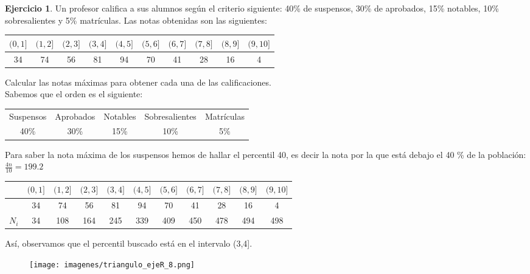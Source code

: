 \documentclass[a4paper, 12pt]{article}
\theoremstyle{definition}
\newtheorem{ej}{Ejercicio}
\begin{document}
\begin{ej}
Un profesor califica a sus alumnos según el criterio siguiente: 40\% de suspensos, 30\% de aprobados, 15\% notables, 10\% sobresalientes y 5\% matrículas. Las notas obtenidas son las siguientes:

\begin{center}
\begin{tabular}{|c|c|c|c|c|c|c|c|c|c|}
\hline
     \((0,1]\) & \((1,2]\) & \((2,3]\) & \((3,4]\) & \((4,5]\) & \((5,6]\) & \((6,7]\) & \((7,8]\) & \((8,9]\) & \((9,10]\) \\
     \hline
     34 & 74 & 56 & 81 & 94 & 70 & 41 & 28 & 16 & 4 \\
     \hline
\end{tabular}
\end{center}

Calcular las notas máximas para obtener cada una de las calificaciones. \\

Sabemos que el orden es el siguiente:

\begin{center}
    \begin{tabular}{c c c c c}
         Suspensos & Aprobados & Notables & Sobresalientes & Matrículas  \\
         40\% & 30\% & 15\% & 10\% & 5\% 
    \end{tabular}
\end{center}

Para saber la nota máxima de los suspensos hemos de hallar el percentil 40, es decir la nota por la que está debajo el 40 \% de la población: \(\frac{4n}{10} = 199.2\)

\begin{center}
\begin{tabular}{|c|c|c|c|c|c|c|c|c|c|c|}
\hline
     & \((0,1]\) & \((1,2]\) & \((2,3]\) & \((3,4]\) & \((4,5]\) & \((5,6]\) & \((6,7]\) & \((7,8]\) & \((8,9]\) & \((9,10]\) \\
     \hline
     & 34 & 74 & 56 & 81 & 94 & 70 & 41 & 28 & 16 & 4 \\
     \hline
     \(N_i\) & 34 & 108 & 164 & 245 & 339 & 409 & 450 & 478 & 494 & 498 \\
     \hline
\end{tabular}
\end{center}

Así, observamos que el percentil buscado está en el intervalo (3,4].

\begin{figure}[h!]
    \centering
    \texttt{[image: imagenes/triangulo\_ejeR\_8.png]}
\end{figure}


\end{ej}
\end{document}
